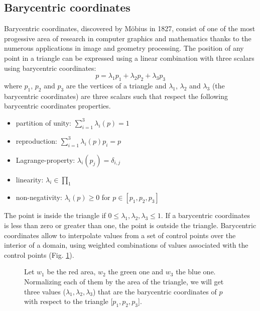 \subsection{Barycentric coordinates}
Barycentric coordinates, discovered by Möbius in 1827, consist of one of the most progessive area of research in computer graphics and mathematics thanks to the numerous applications in image and geometry processing.
\cite{REPORT:localbarycentricoordsepfl} %
The position of any point in a triangle can be expressed using a linear combination with three scalars using barycentric coordinates:
$$ p = \lambda_1 p_1 + \lambda_2 p_2 + \lambda_3 p_3$$
where $p_1$, $p_2$ and $p_3$ are the vertices of a triangle and $\lambda_1$, $\lambda_2$ and $\lambda_3$ (the barycentric coordinates) are three scalars such that
respect the following barycentric coordinates properties.
\cite{WEBSITE:scratchapixel}
\begin{itemize}
  \item partition of unity: $\sum_{i=1}^3 \lambda_{i}(p) = 1$
  \item reproduction: $\sum_{i=1}^3 \lambda_{i}(p)p_i = p$
  \item Lagrange-property: $\lambda_i(p_j) = \delta_{i, j}$
  \item linearity: $\lambda_i \in \prod_1$
  \item non-negativity: $\lambda_i(p)\geq 0$ for $p \in [p_1, p_2, p_3]$
\end{itemize}
\cite{SLIDE:ICORSI}
The point is inside the triangle if $0 \leq \lambda_1, \lambda_2, \lambda_3 \leq 1$. If a barycentric coordinates is less than zero or greater than one, the point is outside the triangle.
Barycentric coordinates allow to interpolate values from a set of control points over the interior of a domain, using weighted combinations of values associated with the control points (Fig. \ref{fig:barycentric-coord}).
\cite{REPORT:localbarycentricoordsepfl}
\begin{figure}
  \centering
    \caption{Let $w_1$ be the red area, $w_2$ the green one and $w_3$ the blue one. Normalizing each of them by the area of the triangle, we will get three values ($\lambda_1, \lambda_2, \lambda_3$) that are the barycentric coordinates of $p$ with respect to the triangle [$p_1, p_2, p_3$].}
    \label{fig:barycentric-coord}
  \end{figure}


